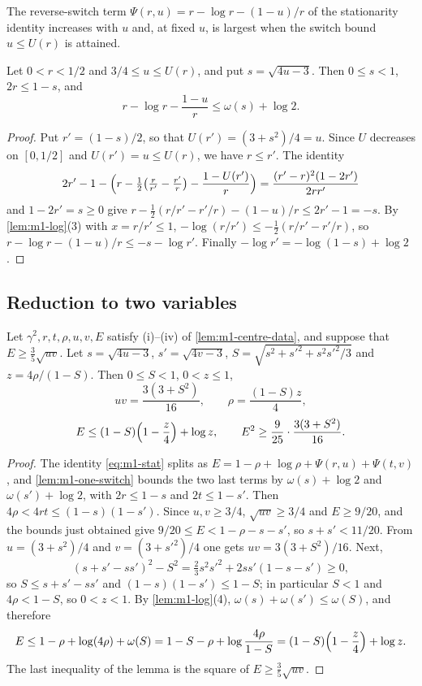 The reverse-switch term $\Psi(r,u)=r-\log r-(1-u)/r$ of the stationarity identity increases with
$u$ and, at fixed $u$, is largest when the switch bound $u\le U(r)$ is attained.

\begin{lemma}\label{lem:m1-one-switch}
  Let $0<r<1/2$ and $3/4\le u\le U(r)$, and put $s=\sqrt{4u-3}$. Then $0\le s<1$, $2r\le 1-s$, and
  \[
    r-\log r-\frac{1-u}r\le\omega(s)+\log2 .
  \]
\end{lemma}

\begin{proof}
  Put $r'=(1-s)/2$, so that $U(r')=(3+s^2)/4=u$. Since $U$ decreases on $[0,1/2]$ and
  $U(r')=u\le U(r)$, we have $r\le r'$. The identity
  \[
    2r'-1-\Bigl(r-\tfrac12\bigl(\tfrac r{r'}-\tfrac{r'}r\bigr)-\frac{1-U(r')}r\Bigr)
    =\frac{(r'-r)^2(1-2r')}{2rr'}
  \]
  and $1-2r'=s\ge0$ give $r-\frac12(r/r'-r'/r)-(1-u)/r\le 2r'-1=-s$. By
  \cref{lem:m1-log}(3) with $x=r/r'\le1$, $-\log(r/r')\le-\frac12(r/r'-r'/r)$, so
  $r-\log r-(1-u)/r\le -s-\log r'$. Finally $-\log r'=-\log(1-s)+\log2$.
\end{proof}

\subsection{Reduction to two variables}

\begin{lemma}\label{lem:m1-reduce}
  Let $\gamma^2,r,t,\rho,u,v,E$ satisfy \textup{(i)--(iv)} of \cref{lem:m1-centre-data}, and suppose
  that $E\ge\frac35\sqrt{uv}$. Let $s=\sqrt{4u-3}$, $s'=\sqrt{4v-3}$,
  $S=\sqrt{s^2+s'^2+s^2s'^2/3}$ and $z=4\rho/(1-S)$. Then $0\le S<1$, $0<z\le1$,
  \[
    uv=\frac{3(3+S^2)}{16},\qquad \rho=\frac{(1-S)z}4,
  \]
  \[
    E\le(1-S)\Bigl(1-\frac z4\Bigr)+\log z,\qquad E^2\ge\frac9{25}\cdot\frac{3(3+S^2)}{16}.
  \]
\end{lemma}

\begin{proof}
  The identity \eqref{eq:m1-stat} splits as
  $E=1-\rho+\log\rho+\Psi(r,u)+\Psi(t,v)$, and \cref{lem:m1-one-switch} bounds the two last terms
  by $\omega(s)+\log2$ and $\omega(s')+\log2$, with $2r\le1-s$ and $2t\le1-s'$. Then
  $4\rho<4rt\le(1-s)(1-s')$. Since $u,v\ge3/4$, $\sqrt{uv}\ge3/4$ and $E\ge9/20$, and the bounds
  just obtained give $9/20\le E<1-\rho-s-s'$, so $s+s'<11/20$. From $u=(3+s^2)/4$ and
  $v=(3+s'^2)/4$ one gets $uv=3(3+S^2)/16$. Next,
  \[
    (s+s'-ss')^2-S^2=\tfrac23s^2s'^2+2ss'(1-s-s')\ge0,
  \]
  so $S\le s+s'-ss'$ and $(1-s)(1-s')\le1-S$; in particular $S<1$ and $4\rho<1-S$, so
  $0<z<1$. By \cref{lem:m1-log}(4), $\omega(s)+\omega(s')\le\omega(S)$, and therefore
  \[
    E\le1-\rho+\log(4\rho)+\omega(S)=1-S-\rho+\log\frac{4\rho}{1-S}
    =(1-S)\Bigl(1-\frac z4\Bigr)+\log z .
  \]
  The last inequality of the lemma is the square of $E\ge\frac35\sqrt{uv}$.
\end{proof}

